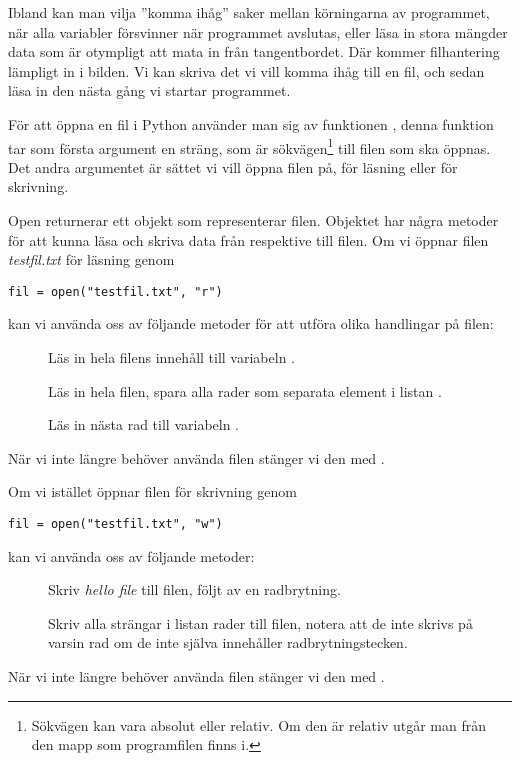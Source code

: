 Ibland kan man vilja ''komma ihåg'' saker mellan körningarna av programmet, när
alla variabler försvinner när programmet avslutas, eller läsa in stora mängder
data som är otympligt att mata in från tangentbordet. Där kommer filhantering
lämpligt in i bilden. Vi kan skriva det vi vill komma ihåg till en fil, och
sedan läsa in den nästa gång vi startar programmet.

För att öppna en fil i Python använder man sig av funktionen ,
denna funktion tar som första argument en sträng, som är
sökvägen\footnote{Sökvägen kan vara absolut eller relativ. Om den är relativ
utgår man från den mapp som programfilen finns i.} till filen som ska öppnas. 
Det andra argumentet är sättet vi vill öppna filen på, för läsning eller
för skrivning.

Open returnerar ett objekt som representerar filen. Objektet har några metoder
för att kunna läsa och skriva data från respektive till filen. Om vi öppnar
filen \emph{testfil.txt} för läsning genom
\begin{lstlisting}
fil = open("testfil.txt", "r")
\end{lstlisting}
kan vi använda oss av följande metoder för att utföra olika handlingar på
filen:
\begin{description}
	\item[] Läs in hela filens innehåll till variabeln
		.
	\item[] Läs in hela filen, spara alla rader
		som separata element i listan .
	\item[] Läs in nästa rad till variabeln
		.
\end{description}
När vi inte längre behöver använda filen stänger vi den med .

Om vi istället öppnar filen för skrivning genom
\begin{lstlisting}
fil = open("testfil.txt", "w")
\end{lstlisting}
kan vi använda oss av följande metoder:
\begin{description}
	\item[] Skriv \emph{hello file} till
		filen, följt av en radbrytning.
	\item[] Skriv alla strängar i listan rader till
		filen, notera att de inte skrivs på varsin rad om de inte själva
		innehåller radbrytningstecken.
\end{description}
När vi inte längre behöver använda filen stänger vi den med .

